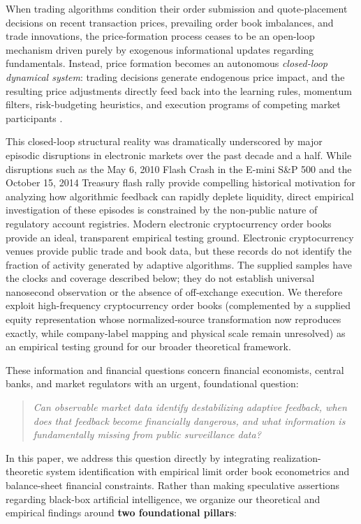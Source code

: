 \documentclass[12pt]{article}
\theoremstyle{definition}
\theoremstyle{remark}
\begin{document}
When trading algorithms condition their order submission and quote-placement decisions on recent transaction prices, prevailing order book imbalances, and trade innovations, the price-formation process ceases to be an open-loop mechanism driven purely by exogenous informational updates regarding fundamentals. Instead, price formation becomes an autonomous \emph{closed-loop dynamical system}: trading decisions generate endogenous price impact, and the resulting price adjustments directly feed back into the learning rules, momentum filters, risk-budgeting heuristics, and execution programs of competing market participants \citep{bouchaud2004fluctuations,cont2010stochastic,cont2014}. 

This closed-loop structural reality was dramatically underscored by major episodic disruptions in electronic markets over the past decade and a half. While disruptions such as the May 6, 2010 Flash Crash in the E-mini S\&P 500 and the October 15, 2014 Treasury flash rally provide compelling historical motivation for analyzing how algorithmic feedback can rapidly deplete liquidity, direct empirical investigation of these episodes is constrained by the non-public nature of regulatory account registries. Modern electronic cryptocurrency order books provide an ideal, transparent empirical testing ground. Electronic cryptocurrency venues provide public trade and book data, but these records do not identify the fraction of activity generated by adaptive algorithms. The supplied samples have the clocks and coverage described below; they do not establish universal nanosecond observation or the absence of off-exchange execution. We therefore exploit high-frequency cryptocurrency order books (complemented by a supplied equity representation whose normalized-source transformation now reproduces exactly, while company-label mapping and physical scale remain unresolved) as an empirical testing ground for our broader theoretical framework.

These information and financial questions concern financial economists, central banks, and market regulators with an urgent, foundational question:
\begin{quote}
\centering
\emph{Can observable market data identify destabilizing adaptive feedback, when does that feedback become financially dangerous, and what information is fundamentally missing from public surveillance data?}
\end{quote}

In this paper, we address this question directly by integrating realization-theoretic system identification with empirical limit order book econometrics and balance-sheet financial constraints. Rather than making speculative assertions regarding black-box artificial intelligence, we organize our theoretical and empirical findings around \textbf{two foundational pillars}:
\end{document}
